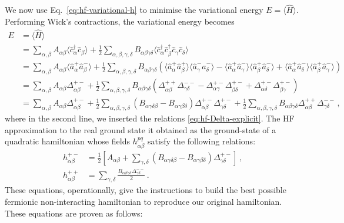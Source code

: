 We now use Eq.~\eqref{eq:hf-variational-h} to minimise the variational energy $E = \langle \hat H \rangle$. Performing Wick's contractions, the variational energy becomes
\begin{align}
	E &= \big\langle \hat H \big\rangle \nonumber \\
	&= \sum_{\alpha,\beta} A_{\alpha\beta} \big\langle \hat c_\alpha^\dagger \hat c_\beta \big\rangle + \frac{1}{2} \sum_{\alpha,\beta,\gamma,\delta} B_{\alpha\beta\gamma\delta} \big\langle \hat c_\alpha^\dagger \hat c_\beta^\dagger \hat c_\gamma \hat c_\delta \big\rangle \nonumber \\
	&= \sum_{\alpha,\beta} A_{\alpha\beta} \big\langle \hat a_\alpha^+ \hat a_\beta^- \big\rangle + \frac{1}{2} \sum_{\alpha,\beta,\gamma,\delta} B_{\alpha\beta\gamma\delta} \left(
		\big\langle \hat a_\alpha^+ \hat a_\beta^+ \big\rangle \big\langle \hat a_\gamma^- \hat a_\delta^- \big\rangle - \big\langle \hat a_\alpha^+ \hat a_\gamma^- \big\rangle \big\langle \hat a_\beta^+ \hat a_\delta^- \big\rangle + \big\langle \hat a_\alpha^+ \hat a_\delta^- \big\rangle \big\langle \hat a_\beta^+ \hat a_\gamma^- \big\rangle
	\right) \nonumber \\
	&= \sum_{\alpha,\beta} A_{\alpha\beta} \Delta_{\alpha\beta}^{+-} + \frac{1}{2} \sum_{\alpha,\beta,\gamma,\delta} B_{\alpha\beta\gamma\delta} \left(
		\Delta_{\alpha\beta}^{++} \Delta_{\gamma\delta}^{--} - \Delta_{\alpha\gamma}^{+-} \Delta_{\beta\delta}^{+-} + \Delta_{\alpha\delta}^{+-} \Delta_{\beta\gamma}^{+-}
	\right) \nonumber \\
	&= \sum_{\alpha,\beta} A_{\alpha\beta} \Delta_{\alpha\beta}^{+-}
	+ \frac{1}{2} \sum_{\alpha,\beta,\gamma,\delta} \left(
		B_{\alpha\gamma\delta\beta} - B_{\alpha\gamma\beta\delta}
	\right) \Delta_{\alpha\beta}^{+-} \Delta_{\gamma\delta}^{+-} 
	+ \frac{1}{2} \sum_{\alpha,\beta,\gamma,\delta} B_{\alpha\beta\gamma\delta} \Delta_{\alpha\beta}^{++} \Delta_{\gamma\delta}^{--} \, ,\label{eq:E=<H>}
\end{align}
where in the second line, we inserted the relations \eqref{eq:hf-Delta-explicit}. The HF approximation to the real ground state it obtained as the ground-state of a quadratic hamiltonian whose fields $h_{\alpha\beta}^{pq}$ satisfy the following relations:
\begin{align}
	h_{\alpha\beta}^{+-} &= \frac{1}{2} \left[
	A_{\alpha\beta} + \sum_{\gamma,\delta}
	\left(
	B_{\alpha\gamma\delta\beta} - B_{\alpha\gamma\beta\delta}
	\right) \Delta_{\gamma\delta}^{+-} 
	\right] \label{eq:hf-solution-h+-} \, , \\
	h_{\alpha\beta}^{++} &= \sum_{\gamma,\delta} \frac{B_{\alpha\beta\gamma\delta} \Delta_{\gamma\delta}^{--}}{2} \label{eq:hf-solution-h++} \, .
\end{align}
These equations, operationally, give the instructions to build the best possible fermionic non-interacting hamiltonian to reproduce our original hamiltonian. These equations are proven as follows:

